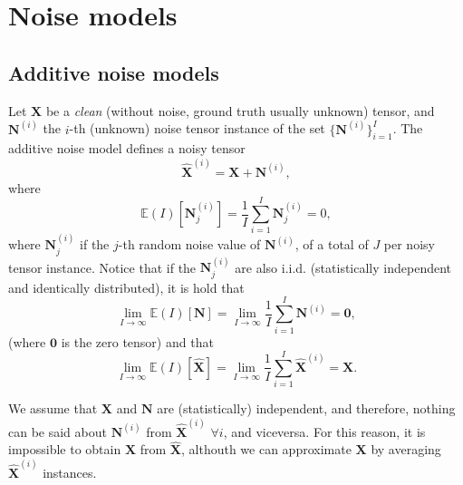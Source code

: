 \documentclass{article}
\begin{document}
\section{Noise models}
\label{sec:noise_models}

\subsection{Additive noise models}

Let $\mathbf{X}$ be a \emph{clean} (without noise, ground truth
usually unknown) tensor, and ${\mathbf N}^{(i)}$ the $i$-th (unknown)
noise tensor instance of the set $\{{\mathbf N}^{(i)}\}_{i=1}^I$. The
additive noise model defines a noisy tensor
\begin{equation}
  \hat{\mathbf X}^{(i)} = {\mathbf X} + {\mathbf N}^{(i)},
  \label{eq:additive_noisy_model}
\end{equation}
where
\begin{equation}
  {\mathbb E}(I)[{\mathbf N}^{(i)}_j]=\frac{1}{I} \sum_{i=1}^I {\mathbf N}_j^{(i)}=0,
  \label{eq:noise_expectation}
\end{equation}
where ${\mathbf N}^{(i)}_j$ if the $j$-th random noise value of ${\mathbf N}^{(i)}$, of a total of $J$ per noisy tensor instance. Notice that if the ${\mathbf N}^{(i)}_j$ are also i.i.d. (statistically independent and identically
distributed), it is hold that
\begin{equation}
  \lim_{I \to \infty}{\mathbb E}(I)[{\mathbf N}]=\lim_{I \to \infty}\frac{1}{I} \sum_{i=1}^I {\mathbf N}^{(i)}={\mathbf 0},
  \label{eq:noise_expectation_2}
\end{equation}
(where ${\mathbf 0}$ is the zero tensor) and that
\begin{equation}
  \lim_{I \to \infty} \mathbb{E}(I)\left[\hat{\mathbf X}\right] = \lim_{I \to \infty} \frac{1}{I} \sum_{i=1}^I \hat{\mathbf X}^{(i)} = {\mathbf X}.
  \label{eq:averaging_result}
\end{equation}

We assume that ${\mathbf X}$ and $\mathbf{N}$ are (statistically)
independent, and therefore, nothing can be said about
${\mathbf N}^{(i)}$ from $\hat{\mathbf X}^{(i)}$ $\forall i$, and
viceversa. For this reason, it is impossible to obtain ${\mathbf X}$
from $\hat{\mathbf X}$, althouth we can approximate ${\mathbf X}$ by
averaging $\hat{\mathbf X}^{(i)}$ instances.
\end{document}
